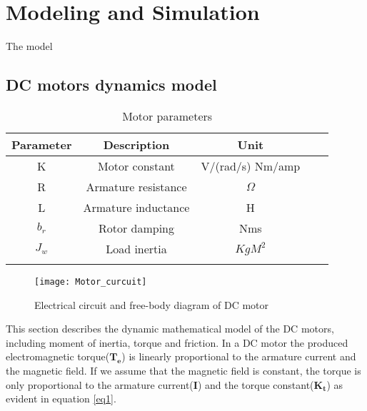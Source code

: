 \chapter{Modeling and Simulation} \label{ch:modeling}


The model

\section{DC motors dynamics model} \label{dc_math}

\begin{table}[h]
\centering
\begin{tabular}{cccll}
\hline
Parameter                   & Description                               & Unit				 &  &  \\ \hline
\multicolumn{1}{|c|}{K}     & \multicolumn{1}{c|}{Motor constant}       & \multicolumn{1}{c|}{ V/(rad/s)  Nm/amp} &  &  \\ \cline{1-3}
\multicolumn{1}{|c|}{R}     & \multicolumn{1}{c|}{Armature resistance}  & \multicolumn{1}{c|}{$\Omega$}            &  &  \\ \cline{1-3}
\multicolumn{1}{|c|}{L}     & \multicolumn{1}{c|}{Armature inductance}  & \multicolumn{1}{c|}{H}                    &  &  \\ \cline{1-3}
\multicolumn{1}{|c|}{$b_r$} & \multicolumn{1}{c|}{Rotor damping}        & \multicolumn{1}{c|}{Nms}                   &  &  \\ \cline{1-3}
\multicolumn{1}{|c|}{$J_w$} & \multicolumn{1}{c|}{Load inertia} & \multicolumn{1}{c|}{$KgM^2$}        &  &  \\ \cline{1-3}
\multicolumn{1}{l}{}        & \multicolumn{1}{l}{}                      & \multicolumn{1}{l}{}                          &  &  \\ \hline
\end{tabular}
\caption{Motor parameters}
\label{my-label}
\end{table}

\begin{figure}[h]
\centering
\texttt{[image: Motor\_curcuit]}
\caption{Electrical circuit and free-body diagram of DC motor \cite{FBD}}
\label{fig::motor_curcuit}
\end{figure} 

This section describes the dynamic mathematical model of the DC motors, including moment of inertia, torque and friction. In a DC motor the produced electromagnetic torque($\boldsymbol{T_e}$) is linearly proportional to the armature current and the magnetic field. If we assume that the magnetic field is constant, the torque is only proportional to the armature current(\textbf{I}) and the torque constant($\boldsymbol{K_t}$) as evident in equation \ref{eq1}. \\

